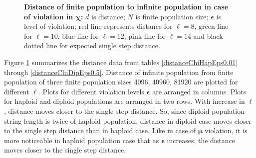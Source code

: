 \begin{figure}[h]
\begin{center}
\hspace{-3em}%
\caption[\textbf{Distance of finite population to infinite population in case of violation in $\bm{\chi}$}]{\textbf{Distance of finite population to infinite population in case of violation in $\bm{\chi}$:}  
  $d$ is distance; $N$ is finite population size; $\bm{\epsilon}$ is level of violation; 
  red line represents distance for $\ell = 8$, green line for $\ell = 10$, blue line for $\ell = 12$, pink line for $\ell = 14$ 
  and black dotted line for expected single step distance.}
\label{vio_chi_dist}
\end{center}
\end{figure}

Figure \ref{vio_chi_dist} summarizes the distance data from tables \ref{distanceChiHapEps0.01} through 
\ref{distanceChiDipEps0.5}. Distance of infinite population from finite population of 
three finite population sizes {4096, 40960, 81920} are plotted for different $\ell$. 
Plots for different violation levels $\bm{\epsilon}$ are arranged in columns. 
Plots for haploid and diploid populations are arranged in two rows. With increase in $\ell$, 
distance moves closer to the single step distance. So, since diploid population 
string length is twice of haploid population, 
distance in diploid case moves closer to the single step distance than in haploid case. 
Like in case of $\bm{\mu}$ violation, it is more noticeable in haploid population case that as $\bm{\epsilon}$ increases, 
the distance moves closer to the single step distance.

